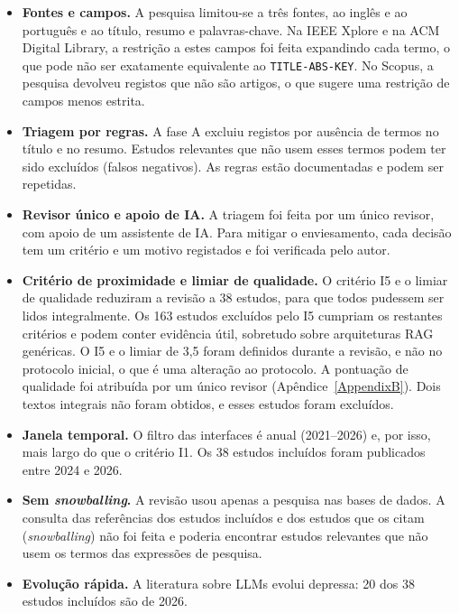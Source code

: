 \begin{itemize}
    \item \textbf{Fontes e campos.} A pesquisa limitou-se a três fontes, ao inglês e ao português e ao título, resumo e palavras-chave. Na IEEE Xplore e na ACM Digital Library, a restrição a estes campos foi feita expandindo cada termo, o que pode não ser exatamente equivalente ao \texttt{TITLE-ABS-KEY}. No Scopus, a pesquisa devolveu registos que não são artigos, o que sugere uma restrição de campos menos estrita.
    \item \textbf{Triagem por regras.} A fase A excluiu registos por ausência de termos no título e no resumo. Estudos relevantes que não usem esses termos podem ter sido excluídos (falsos negativos). As regras estão documentadas e podem ser repetidas.
    \item \textbf{Revisor único e apoio de \gls{IA}.} A triagem foi feita por um único revisor, com apoio de um assistente de \gls{IA}. Para mitigar o enviesamento, cada decisão tem um critério e um motivo registados e foi verificada pelo autor. %
    \item \textbf{Critério de proximidade e limiar de qualidade.} O critério I5 e o limiar de qualidade reduziram a revisão a 38 estudos, para que todos pudessem ser lidos integralmente. Os 163 estudos excluídos pelo I5 cumpriam os restantes critérios e podem conter evidência útil, sobretudo sobre arquiteturas \gls{RAG} genéricas. O I5 e o limiar de 3,5 foram definidos durante a revisão, e não no protocolo inicial, o que é uma alteração ao protocolo. A pontuação de qualidade foi atribuída por um único revisor (Apêndice~\ref{AppendixB}). Dois textos integrais não foram obtidos, e esses estudos foram excluídos.
    \item \textbf{Janela temporal.} O filtro das interfaces é anual (2021--2026) e, por isso, mais largo do que o critério I1. Os 38 estudos incluídos foram publicados entre 2024 e 2026.
    \item \textbf{Sem \emph{snowballing}.} A revisão usou apenas a pesquisa nas bases de dados. A consulta das referências dos estudos incluídos e dos estudos que os citam (\emph{snowballing}) não foi feita e poderia encontrar estudos relevantes que não usem os termos das expressões de pesquisa.
    \item \textbf{Evolução rápida.} A literatura sobre \glspl{LLM} evolui depressa: 20 dos 38 estudos incluídos são de 2026.
\end{itemize}

